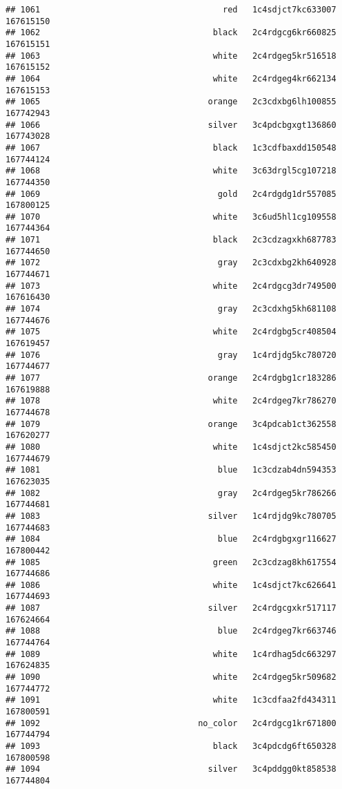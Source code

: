 \documentclass[
]{article}
\begin{document}
\begin{verbatim}
## 1061                                     red   1c4sdjct7kc633007 167615150
## 1062                                   black   2c4rdgcg6kr660825 167615151
## 1063                                   white   2c4rdgeg5kr516518 167615152
## 1064                                   white   2c4rdgeg4kr662134 167615153
## 1065                                  orange   2c3cdxbg6lh100855 167742943
## 1066                                  silver   3c4pdcbgxgt136860 167743028
## 1067                                   black   1c3cdfbaxdd150548 167744124
## 1068                                   white   3c63drgl5cg107218 167744350
## 1069                                    gold   2c4rdgdg1dr557085 167800125
## 1070                                   white   3c6ud5hl1cg109558 167744364
## 1071                                   black   2c3cdzagxkh687783 167744650
## 1072                                    gray   2c3cdxbg2kh640928 167744671
## 1073                                   white   2c4rdgcg3dr749500 167616430
## 1074                                    gray   2c3cdxhg5kh681108 167744676
## 1075                                   white   2c4rdgbg5cr408504 167619457
## 1076                                    gray   1c4rdjdg5kc780720 167744677
## 1077                                  orange   2c4rdgbg1cr183286 167619888
## 1078                                   white   2c4rdgeg7kr786270 167744678
## 1079                                  orange   3c4pdcab1ct362558 167620277
## 1080                                   white   1c4sdjct2kc585450 167744679
## 1081                                    blue   1c3cdzab4dn594353 167623035
## 1082                                    gray   2c4rdgeg5kr786266 167744681
## 1083                                  silver   1c4rdjdg9kc780705 167744683
## 1084                                    blue   2c4rdgbgxgr116627 167800442
## 1085                                   green   2c3cdzag8kh617554 167744686
## 1086                                   white   1c4sdjct7kc626641 167744693
## 1087                                  silver   2c4rdgcgxkr517117 167624664
## 1088                                    blue   2c4rdgeg7kr663746 167744764
## 1089                                   white   1c4rdhag5dc663297 167624835
## 1090                                   white   2c4rdgeg5kr509682 167744772
## 1091                                   white   1c3cdfaa2fd434311 167800591
## 1092                                no_color   2c4rdgcg1kr671800 167744794
## 1093                                   black   3c4pdcdg6ft650328 167800598
## 1094                                  silver   3c4pddgg0kt858538 167744804

\end{verbatim}
\end{document}
